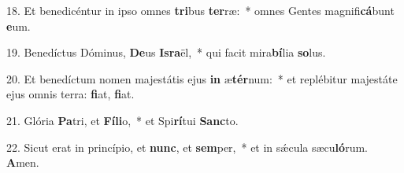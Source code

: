 18. Et benedicéntur in ipso omnes \textbf{tri}bus \textbf{ter}ræ:~*  omnes Gentes magnifi\textbf{cá}bunt \textbf{e}um.\

19. Benedíctus Dóminus, \textbf{De}us \textbf{Is}\textbf{ra}ël,~*  qui facit mira\textbf{bí}lia \textbf{so}lus.\

20. Et benedíctum nomen majestátis ejus \textbf{in} æ\textbf{tér}num:~*  et replébitur majestáte ejus omnis terra: \textbf{fi}at, \textbf{fi}at.\

21. Glória \textbf{Pa}tri, et \textbf{Fí}\textbf{li}o,~*  et Spi\textbf{rí}tui \textbf{Sanc}to.\

22. Sicut erat in princípio, et \textbf{nunc}, et \textbf{sem}per,~*  et in sǽcula sæcu\textbf{ló}rum. \textbf{A}men.\

